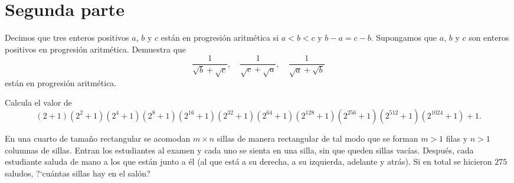 \section{Segunda parte}
\label{sec:segunda-parte2013}

\begin{Problema}{11}
Decimos que tres enteros positivos $a$, $b$ y $c$ est\'an en
  progresi\'on aritm\'etica si $a < b < c$ y $b-a=c-b$. Supongamos que
  $a$, $b$ y $c$ son enteros positivos en progresi\'on
  aritm\'etica. Demuestra que
$$
\frac{1}{\sqrt{b}+\sqrt{c}}, \quad \frac{1}{\sqrt{c}+\sqrt{a}}, \quad \frac{1}{\sqrt{a}+\sqrt{b}}
$$
est\'an en progresi\'on aritm\'etica.
\end{Problema}

\begin{Problema}{12}
  Calcula el valor de
$$
(2+1)(2^2+1)(2^4+1)(2^8+1)(2^{16}+1)(2^{32}+1)(2^{64}+1)(2^{128}+1)(2^{256}+1)(2^{512}+1)(2^{1024}+1) + 1.
$$
\end{Problema}

\begin{Problema}{13}
En una cuarto de tama\~no rectangular se acomodan $m \times n$ sillas de
  manera rectangular de tal modo que se forman $m>1$ filas y $n>1$
  columnas de sillas. Entran los estudiantes al examen y cada uno se
  sienta en una silla, sin que queden sillas vac\'ias. Despu\'es, cada
  estudiante saluda de mano a los que est\'an junto a \'el (al que
  est\'a a su derecha, a su izquierda, adelante y atr\'as). Si en total
  se hicieron $275$ saludos, ?`cu\'antas sillas hay en el sal\'on?
\end{Problema}

